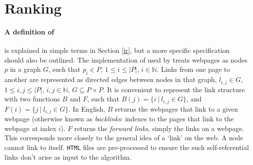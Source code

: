 \section{Ranking\label{rank}}
\paragraph{A definition of \pr{}}
\pr{} \cite{page1999} is explained in simple terms in Section
\ref{ir}, but a more specific specification should also be outlined.
The implementation of \pr{} used by \nr{} treats webpages as nodes $p$ in
a graph $G$, such that $p_i \in P$, $1 \le i \le |P|$, $i \in \mathbb{N}$.  Links from one page to another
are represented as directed edges between nodes in that graph,
$l_{i,j} \in G$, $1 \le i, j \le |P|$, $i, j \in \mathbb{N}$, $G \subseteq P \times P$.  
It is convenient to represent the link structure with two functions $B$
and $F$, such that $B(j) = \{i~|~l_{i, j} \in G\}$, and
$F(i) = \{j~|~l_{i, j} \in G\}$.
In English, $B$ returns
the webpages that link to a given webpage (otherwise known as
{\it backlinks}: indexes to the pages that
link to the webpage at index $i$).  $F$ returns the {\it forward links},
simply the links on a webpage.  This corresponds more closely to the general
idea of a `link' on the web.  A node cannot link to itself.  {\tt HTML}
files are pre-processed to ensure the such self-referential links don't
arise as input to the algorithm.

